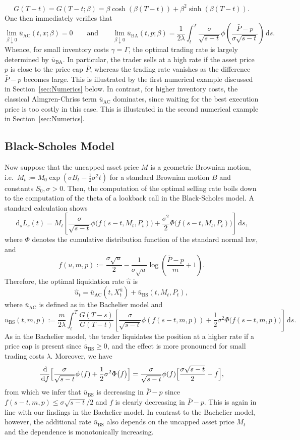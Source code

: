 \documentclass[11pt]{article}
\numberwithin{equation}{section}
\theoremstyle{definition}
\theoremstyle{remark}
\newcommand{\de}{\,\mathrm{d}}
\begin{document}
\[
 G(T-t) = G(T-t;\beta) = \beta\cosh(\beta(T-t)) + \beta^2 \sinh(\beta(T-t)).
\]
One then immediately verifies that
\[
 \lim_{\beta\downarrow 0} \bar u_{\mathrm{AC}}(t,x;\beta) = 0\qquad\text{and}\qquad \lim_{\beta\downarrow 0} \bar u_{\mathrm{BA}}(t,p;\beta) = \frac{1}{2\lambda} \int_t^T \frac{\sigma}{\sqrt{s-t}} \phi\left(\frac{\bar{P}-p}{\sigma\sqrt{s-t}} \right) \de s.
\]
Whence, for small inventory costs $\gamma=\Gamma$, the optimal trading rate is largely determined by $\bar{u}_{\mathrm{BA}}$. In particular, the trader sells at a high rate if the asset price $p$ is close to the price cap $\bar P$, whereas the trading rate vanishes as the difference $\bar P - p$ becomes large. This is illustrated by the first numerical example discussed in Section~\ref{sec:Numerics} below. In contrast, for higher inventory costs, the classical Almgren-Chriss term $\bar{u}_{\mathrm{AC}}$ dominates, since waiting for the best execution price is too costly in this case. This is illustrated in the second numerical example in Section~\ref{sec:Numerics}.


\subsection{Black-Scholes Model}
Now suppose that the uncapped asset price $M$ is a geometric Brownian motion, i.e.\ $M_t:=M_0\exp\left(\sigma B_t-\frac{1}{2}\sigma^2 t\right)$ for a standard Brownian motion $B$ and constants $S_0, \sigma >0$. Then, the computation of the optimal selling rate boils down to the computation of the theta of a lookback call in the Black-Scholes model. A standard calculation shows
\[
\de_s L_s(t) = M_t\left[ \frac{\sigma}{\sqrt{s-t}}\phi\bigl(f(s-t,M_t,P_t)\bigr)+\frac{\sigma^2}{2}\Phi\bigl(f(s-t,M_t,P_t)\bigr)\right] \de s,
\]
where $\Phi$ denotes the cumulative distribution function of the standard normal law, and
\[
 f(u,m,p) := \frac{\sigma\sqrt{u}}{2} - \frac{1}{\sigma\sqrt{u}}\log\left(\frac{\bar{P}-p}{m}+1\right).
\]
Therefore, the optimal liquidation rate $\hat{u}$ is 
\[
 \hat{u}_t = \bar{u}_{\mathrm{AC}}(t,X^{\hat{u}}_t) + \bar{u}_{\mathrm{BS}}(t,M_t,P_t),
\]
where $\bar{u}_{\mathrm{AC}}$ is defined as in the Bachelier model and
\[
 \bar{u}_{\mathrm{BS}}(t,m,p) := \frac{m}{2\lambda}\int_t^T  \frac{G(T-s)}{G(T-t)} \left[ \frac{\sigma}{\sqrt{s-t}}\phi\left(f(s-t,m,p)\right)+\frac{1}{2}\sigma^2 \Phi\bigl(f(s-t,m,p)\bigr)\right] \de s.
\]
As in the Bachelier model, the trader liquidates the position at a higher rate if a price cap is present since $\bar{u}_{\mathrm{BS}}\ge 0$, and the effect is more pronounced for small trading costs $\lambda$. Moreover, we have
\[
 \frac{\de }{\de f} \Bigl[\frac{\sigma}{\sqrt{s-t}}\phi\left(f\right)+\frac{1}{2}\sigma^2 \Phi\bigl(f\bigr)\Bigr] = \frac{\sigma}{\sqrt{s-t}}\phi(f)\Bigl[\frac{\sigma\sqrt{s-t}}{2} - f\Bigr],
\]
from which we infer that $\bar{u}_{\mathrm{BS}}$ is decreasing in $\bar P - p$ since $f(s-t,m,p) \leq \sigma\sqrt{s-t}/2$ and $f$ is clearly decreasing in $\bar P - p$. This is again in line with our findings in the Bachelier model. In contrast to the Bachelier model, however, the additional rate $\bar{u}_{\mathrm{BS}}$ also depends on the uncapped asset price $M_t$ and the dependence is monotonically increasing.
\end{document}
